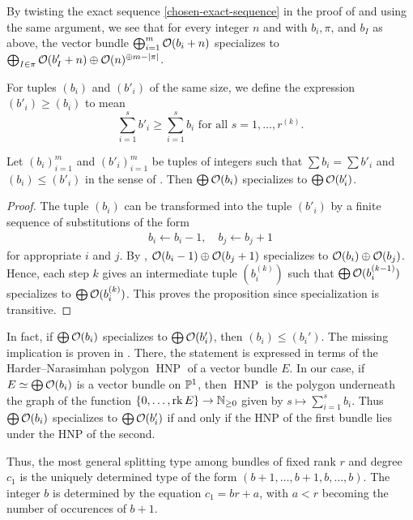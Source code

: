 \begin{remark} \label{my-specialization}
	By twisting the exact sequence \cref{chosen-exact-sequence} in the proof of  and using the same argument, we see that for every integer $n$ and with $b_i, \pi$, and $b_I$ as above, the vector bundle $\bigoplus_{i=1}^m \mathcal{O} (b_i+n)$ specializes to $\bigoplus_{I\in\pi} \mathcal{O}(b'_I+n) \oplus \mathcal{O}(n)^{\oplus m-\lvert\pi\rvert}$.
\end{remark}

\begin{definition} \label{def-compare-types}
	For tuples $(b_i)$ and $(b'_i)$ of the same size, we define the expression $(b'_i) \geq (b_i)$ to mean
	\[
		\sum_{i=1}^s b'_i \geq \sum_{i=1}^s b_i \text{ for all $s=1,\dotsc, r^{(k)}$}.
	\]
\end{definition}

\begin{proposition}
	Let $(b_i)_{i=1}^m$ and $(b'_i)_{i=1}^m$ be tuples of integers such that $\sum b_i = \sum b'_i$ and $(b_i)\leq (b'_i)$ in the sense of . Then $\bigoplus \mathcal{O}(b_i)$ specializes to $\bigoplus \mathcal{O}(b'_i)$.
\end{proposition}

\begin{proof}
	The tuple $(b_i)$ can be transformed into the tuple $(b'_i)$ by a finite sequence of substitutions of the form
	\begin{align*}
		b_i \leftarrow b_i - 1, \quad
		b_{j} \leftarrow b_{j} +1
	\end{align*}
	for appropriate $i$ and $j$. By , $\mathcal{O}(b_i - 1) \oplus \mathcal{O}(b_j + 1)$ specializes to $\mathcal{O}(b_i) \oplus \mathcal{O}(b_j)$. Hence, each step $k$ gives an intermediate tuple $(b_i^{(k)})$ such that $\bigoplus \mathcal{O}(b_i^{(k-1)})$ specializes to $\bigoplus \mathcal{O}(b_i^{(k)})$. This proves the proposition since specialization is transitive.
\end{proof}

\newcommand{\HNP}{\operatorname{HNP}}

\begin{remark}
	In fact, if $\bigoplus \mathcal{O}(b_i)$ specializes to $\bigoplus \mathcal{O}(b_i')$, then $(b_i)\leq (b_i')$. The missing implication is proven \eg in \cite[Thm.\ 3]{schatz-degeneration-specialization}. There, the statement is expressed in terms of the Harder–Narasimhan polygon $\HNP$ of a vector bundle $E$. In our case, if $E\simeq \bigoplus \mathcal{O}(b_i)$ is a vector bundle on $\mathbb{P}^1$, then $\HNP$ is the polygon underneath the graph of the function $\{0,\dotsc,\operatorname{rk} E\}\to \mathbb{N}_{\geq 0}$ given by $s\mapsto \sum_{i=1}^s b_i$. Thus $\bigoplus \mathcal{O}(b_i)$ specializes to $\bigoplus \mathcal{O}(b_i')$ if and only if the HNP of the first bundle lies under the HNP of the second.

	Thus, the most general splitting type among bundles of fixed rank $r$ and degree $c_1$ is the uniquely determined type 
    of the form
	$(b + 1,\dotsc,b + 1,b,\dotsc,b)$. The integer $b$ is determined by the equation
	$c_1 = b r + a$, with $a < r$ becoming the number of occurences of $b +1$.
\end{remark}